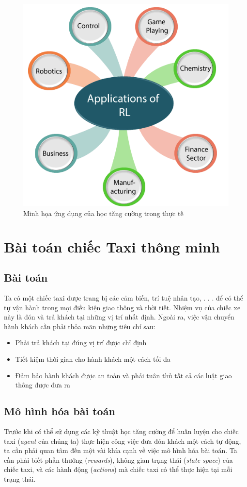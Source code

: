 \documentclass[12pt,a4paper]{report}
\begin{document}
\begin{figure}
	\centering
	\includegraphics[scale=.5]{5}
	\caption{Minh họa ứng dụng của học tăng cường trong thực tế}
\end{figure}
\section{Bài toán chiếc Taxi thông minh}
\subsection{Bài toán}
Ta có một chiếc taxi được trang bị các cảm biến, trí tuệ nhân tạo, . . . để có thể tự vận
hành trong mọi điều kiện giao thông và thời tiết. Nhiệm vụ của chiếc xe này là đón và trả
khách tại những vị trí nhất định. Ngoài ra, việc vận chuyển hành khách cần phải thỏa mãn
những tiêu chí sau:
\begin{itemize}
	\item Phải trả khách tại đúng vị trí được chỉ định
	\item Tiết kiệm thời gian cho hành khách một cách tối đa
	\item Đảm bảo hành khách được an toàn và phải tuân thủ tất cả các luật giao thông được đưa
	ra
\end{itemize}
\subsection{Mô hình hóa bài toán}
Trước khi có thể sử dụng các kỹ thuật học tăng cường để huấn luyện cho chiếc taxi (\textit{agent}
của chúng ta) thực hiện công việc đưa đón khách một cách tự động, ta cần phải quan tâm
đến một vài khía cạnh về việc mô hình hóa bài toán. Ta cần phải biết phần thưởng (\textit{rewards}),
không gian trạng thái (\textit{state space}) của chiếc taxi, và các hành động (\textit{actions}) mà chiếc taxi
có thể thực hiện tại mỗi trạng thái.
\end{document}
